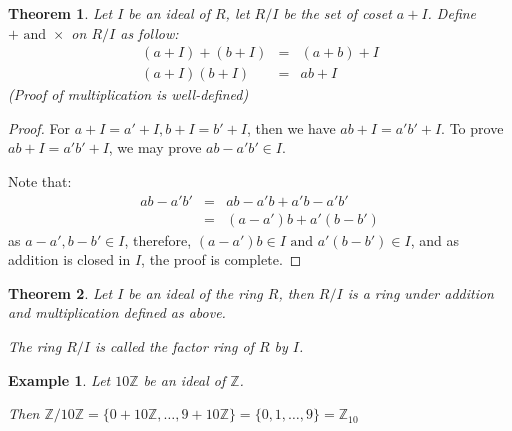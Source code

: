 \documentclass{article}
\theoremstyle{MyNonumberplain}
\theoremstyle{break}
\newtheorem*{proof}{Proof. }
\newcommand{\infixand}{\text{ and }}
\theoremstyle{break}
\newtheorem{theorem}{Theorem}[section]
\newtheorem{example}{Example}[section]
\theoremstyle{break}
\theoremstyle{definition}
\theoremstyle{break}
\begin{document}
\begin{thmbox}
    \begin{theorem}
        Let $I$ be an ideal of $R$, let $R / I$ be the set of coset $a + I$. Define $+
        \infixand \times$ on $R / I$ as follow:
        \begin{eqnarray*}
          (a + I) + (b + I) & = & (a + b) + I\\
          (a + I) (b + I) & = & a b + I
        \end{eqnarray*}
        (Proof of multiplication is well-defined)
    \end{theorem}
    \begin{prfbox}
        \begin{proof}
            For $a + I = a' + I, b + I = b' + I$, then we have $a b + I = a' b' + I$. To
            prove $a b + I = a' b' + I$, we may prove $a b - a' b' \in I$.\bigskip
            
            Note that:
            \begin{eqnarray*}
              a b - a' b' & = & a b - a' b + a' b - a' b'\\
              & = & (a - a') b + a' (b - b')
            \end{eqnarray*}
            as $a - a', b - b' \in I$, therefore, $(a - a') b \in I \infixand a' (b - b')
            \in I$, and as addition is closed in $I$, the proof is complete.
        \end{proof}
    \end{prfbox}
\end{thmbox}

\begin{thmbox}
    \begin{theorem}
        Let $I$ be an ideal of the ring $R$, then $R / I$ is a ring under addition and
        multiplication defined as above.\bigskip
        
        The ring $R / I$ is called the factor ring of $R$ by $I$. 
    \end{theorem}

\end{thmbox}


\begin{expbox}
    \begin{example}
        Let $10\mathbb{Z}$ be an ideal of $\mathbb{Z}$.\bigskip

        Then $\mathbb{Z}/ 10\mathbb{Z}= \{ 0 + 10\mathbb{Z}, \ldots, 9 + 10\mathbb{Z}
        \} = \{ 0, 1, \ldots, 9 \} =\mathbb{Z}_{10}$
    \end{example}
\end{expbox}
\end{document}
